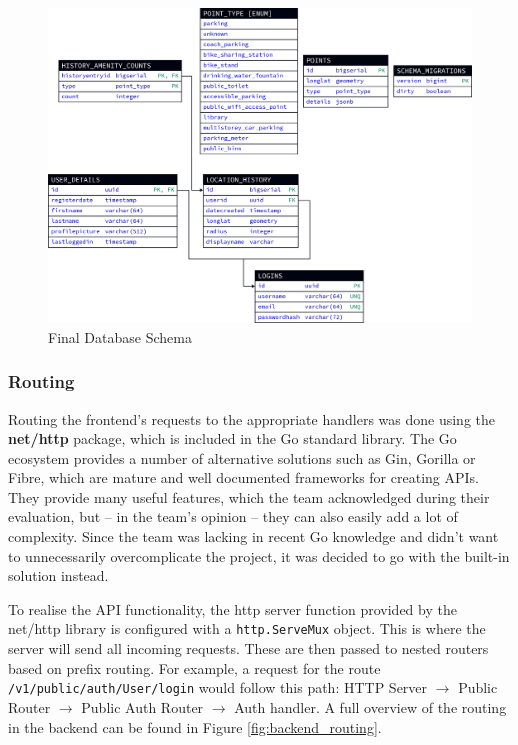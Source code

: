 \begin{figure}[htbp]
  \centering{}
  \includegraphics[width=\textwidth]{../d2-diagrams/database-final/database-final.png}
  \caption{Final Database Schema}
  \label{fig:database_final_schema}
\end{figure}

\newpage{}

\subsubsection{Routing}
Routing the frontend's requests to the appropriate handlers was done using the
\textbf{net/http} package, which is included in the Go standard library. The Go
ecosystem provides a number of alternative solutions such as Gin, Gorilla or
Fibre, which are mature and well documented frameworks for creating APIs. They
provide many useful features, which the team acknowledged during their
evaluation, but -- in the team's opinion -- they can also easily add a lot of
complexity. Since the team was lacking in recent Go knowledge and didn't want to
unnecessarily overcomplicate the project, it was decided to go with the built-in
solution instead.

To realise the API functionality, the http server function provided by the
net/http library is configured with a \texttt{http.ServeMux} object. This is
where the server will send all incoming requests. These are then passed to
nested routers based on prefix routing. For example, a request for the route
\texttt{/v1/public/auth/User/login} would follow this path: HTTP Server
$\rightarrow$ Public Router $\rightarrow$ Public Auth Router $\rightarrow$ Auth
handler. A full overview of the routing in the backend can be found in Figure
\ref{fig:backend_routing}.

